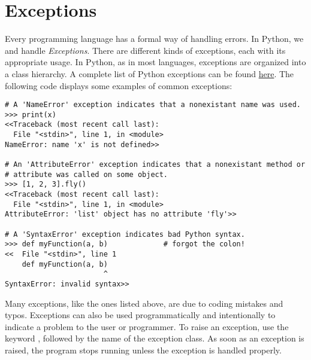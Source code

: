 \label{lab:OOP2}


\section*{Exceptions}

Every programming language has a formal way of handling errors.
In Python, we  and handle \emph{Exceptions}.
There are different kinds of exceptions, each with its appropriate usage.
In Python, as in most languages, exceptions are organized into a class hierarchy.
A complete list of Python exceptions can be found \href{https://docs.python.org/2/library/exceptions.html}{here}.
The following code displays some examples of common exceptions:

\begin{lstlisting}
# A 'NameError' exception indicates that a nonexistant name was used.
>>> print(x)
<<Traceback (most recent call last):
  File "<stdin>", line 1, in <module>
NameError: name 'x' is not defined>>

# An 'AttributeError' exception indicates that a nonexistant method or
# attribute was called on some object.
>>> [1, 2, 3].fly()
<<Traceback (most recent call last):
  File "<stdin>", line 1, in <module>
AttributeError: 'list' object has no attribute 'fly'>>

# A 'SyntaxError' exception indicates bad Python syntax.
>>> def myFunction(a, b)             # forgot the colon!
<<  File "<stdin>", line 1
    def myFunction(a, b)
                       ^
SyntaxError: invalid syntax>>
\end{lstlisting}

Many exceptions, like the ones listed above, are due to coding mistakes and typos.
Exceptions can also be used programmatically and intentionally to indicate a problem to the user or programmer.
To raise an exception, use the keyword , followed by the name of the exception class.
As soon as an exception is raised, the program stops running unless the exception is handled properly.

